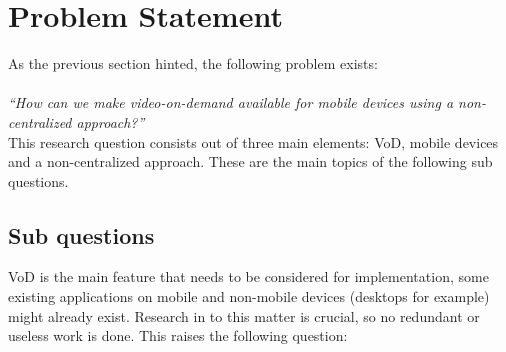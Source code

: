 \section{Problem Statement}
As the previous section hinted, the following problem exists:\\
\\
\textit{``How can we make video-on-demand available for mobile devices using a non-centralized approach?''}\\

This research question consists out of three main elements: VoD, mobile devices and a non-centralized approach. These are the main topics of the following sub questions.

\subsection{Sub questions}
VoD is the main feature that needs to be considered for implementation, some existing applications on mobile and non-mobile devices (desktops for example) might already exist. Research in to this matter is crucial, so no redundant or useless work is done. This raises the following question:

